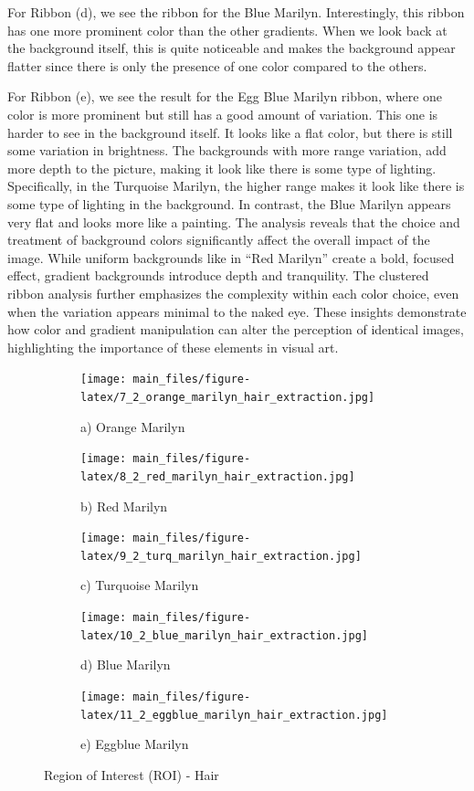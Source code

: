\documentclass{article}
\begin{document}
For Ribbon (d), we see the ribbon for the Blue Marilyn. Interestingly,
this ribbon has one more prominent color than the other gradients. When
we look back at the background itself, this is quite noticeable and
makes the background appear flatter since there is only the presence of
one color compared to the others.

For Ribbon (e), we see the result for the Egg Blue Marilyn ribbon, where
one color is more prominent but still has a good amount of variation.
This one is harder to see in the background itself. It looks like a flat
color, but there is still some variation in brightness. The backgrounds
with more range variation, add more depth to the picture, making it look
like there is some type of lighting. Specifically, in the Turquoise
Marilyn, the higher range makes it look like there is some type of
lighting in the background. In contrast, the Blue Marilyn appears very
flat and looks more like a painting. The analysis reveals that the
choice and treatment of background colors significantly affect the
overall impact of the image. While uniform backgrounds like in ``Red
Marilyn'' create a bold, focused effect, gradient backgrounds introduce
depth and tranquility. The clustered ribbon analysis further emphasizes
the complexity within each color choice, even when the variation appears
minimal to the naked eye. These insights demonstrate how color and
gradient manipulation can alter the perception of identical images,
highlighting the importance of these elements in visual art.

\begin{figure}[htbp]
    \centering
    \begin{subfigure}[b]{0.19\textwidth}
        \texttt{[image: main\_files/figure-latex/7\_2\_orange\_marilyn\_hair\_extraction.jpg]}
        \caption*{a) Orange Marilyn}
    \end{subfigure}
    \hfill
    \begin{subfigure}[b]{0.19\textwidth}
        \texttt{[image: main\_files/figure-latex/8\_2\_red\_marilyn\_hair\_extraction.jpg]}
        \caption*{b) Red Marilyn}
    \end{subfigure}
    \hfill
    \begin{subfigure}[b]{0.19\textwidth}
        \texttt{[image: main\_files/figure-latex/9\_2\_turq\_marilyn\_hair\_extraction.jpg]}
        \caption*{c) Turquoise Marilyn}
    \end{subfigure}
    \hfill
    \begin{subfigure}[b]{0.19\textwidth}
        \texttt{[image: main\_files/figure-latex/10\_2\_blue\_marilyn\_hair\_extraction.jpg]}
        \caption*{d) Blue Marilyn}
    \end{subfigure}
    \hfill
    \begin{subfigure}[b]{0.19\textwidth}
        \texttt{[image: main\_files/figure-latex/11\_2\_eggblue\_marilyn\_hair\_extraction.jpg]}
        \caption*{e) Eggblue Marilyn}
    \end{subfigure}
    
    \caption{Region of Interest (ROI) - Hair}
\end{figure}
\end{document}
